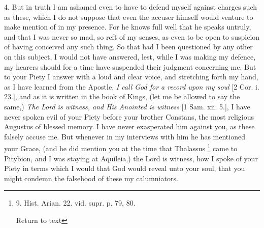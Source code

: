 4. But in truth I am ashamed even to have to defend myself against
charges such as these, which I do not suppose that even the accuser
himself would venture to make mention of in my presence. For he knows
full well that he speaks untruly, and that I was never so mad, so reft
of my senses, as even to be open to suspicion of having conceived any
such thing. So that had I been questioned by any other on this
subject, I would not have answered, lest, while I was making my
defence, my hearers should for a time have suspended their judgment
concerning me. But to your Piety I answer with a loud and clear voice,
and stretching forth my hand, as I have learned from the Apostle, \emph{I
call God for a record upon my soul} [2 Cor. i. 23.], and as it is written in the
book of Kings, (let me be allowed to say the same,) \emph{The Lord is witness, and His
Anointed is witness} [1 Sam. xii. 5.], I have never spoken evil of your
Piety before your brother Constans, the most religious Augustus of
blessed memory. I have never exasperated him against you, as these
falsely accuse me. But whenever in my interviews with him he has
mentioned your Grace, (and he did mention you at the time that
Thalassus \footnote{9. Hist. Arian. 22. vid. supr. p. 79, 80.

Return to text} came to
Pitybion, and I was staying at Aquileia,) the Lord is witness, how I
spoke of your Piety in terms which I would that God would reveal unto
your soul, that you might condemn the falsehood of these my
calumniators.

